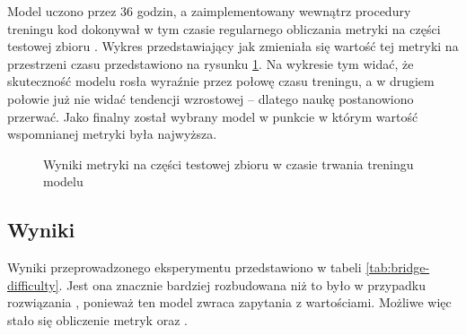 Model uczono przez 36 godzin, a zaimplementowany wewnątrz procedury treningu kod dokonywał w tym czasie regularnego obliczania metryki  na części testowej zbioru . Wykres przedstawiający jak zmieniała się wartość tej metryki na przestrzeni czasu przedstawiono na rysunku \ref{plot:bridge-accuracy}. Na wykresie tym widać, że skuteczność modelu rosła wyraźnie przez połowę czasu treningu, a w drugiem połowie już nie widać tendencji wzrostowej -- dlatego naukę postanowiono przerwać. Jako finalny został wybrany model w punkcie w którym wartość wspomnianej metryki była najwyższa.

\begin{figure}[ht!]
  \begin{center}
    \caption{Wyniki metryki  na części testowej zbioru  w czasie trwania treningu modelu}
    \label{plot:bridge-accuracy}
  \end{center}
\end{figure}

\subsection{Wyniki}
Wyniki przeprowadzonego eksperymentu przedstawiono w tabeli \ref{tab:bridge-difficulty}. Jest ona znacznie bardziej rozbudowana niż to było w przypadku rozwiązania , ponieważ ten model zwraca zapytania z wartościami. Możliwe więc stało się obliczenie metryk  oraz .

